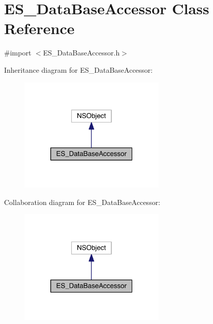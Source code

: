 \hypertarget{interface_e_s___data_base_accessor}{\section{E\+S\+\_\+\+Data\+Base\+Accessor Class Reference}
\label{interface_e_s___data_base_accessor}
}


{\ttfamily \#import $<$E\+S\+\_\+\+Data\+Base\+Accessor.\+h$>$}



Inheritance diagram for E\+S\+\_\+\+Data\+Base\+Accessor\+:\nopagebreak
\begin{figure}[H]
\begin{center}
\leavevmode
\includegraphics[width=198pt]{d9/df7/interface_e_s___data_base_accessor__inherit__graph}
\end{center}
\end{figure}


Collaboration diagram for E\+S\+\_\+\+Data\+Base\+Accessor\+:\nopagebreak
\begin{figure}[H]
\begin{center}
\leavevmode
\includegraphics[width=198pt]{d6/d9e/interface_e_s___data_base_accessor__coll__graph}
\end{center}
\end{figure}
